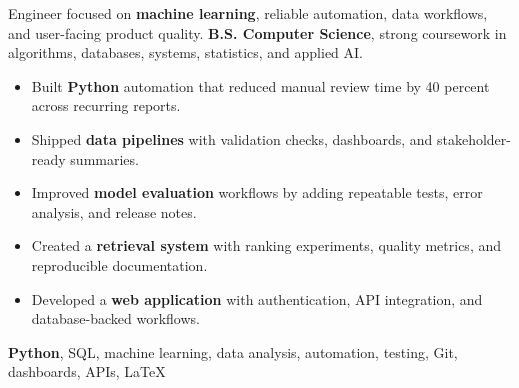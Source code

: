 \documentclass[10pt]{article}
\begin{document}
Engineer focused on \textbf{machine learning}, reliable automation, data workflows, and user-facing product quality.
\textbf{B.S. Computer Science}, strong coursework in algorithms, databases, systems, statistics, and applied AI.
\begin{itemize}\item Built \textbf{Python} automation that reduced manual review time by 40 percent across recurring reports.\item Shipped \textbf{data pipelines} with validation checks, dashboards, and stakeholder-ready summaries.\item Improved \textbf{model evaluation} workflows by adding repeatable tests, error analysis, and release notes.\end{itemize}
\begin{itemize}\item Created a \textbf{retrieval system} with ranking experiments, quality metrics, and reproducible documentation.\item Developed a \textbf{web application} with authentication, API integration, and database-backed workflows.\end{itemize}
\textbf{Python}, SQL, machine learning, data analysis, automation, testing, Git, dashboards, APIs, LaTeX
\end{document}
